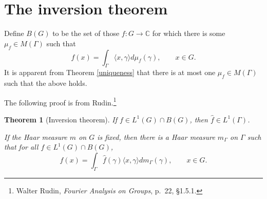 \documentclass{article}
\newcommand{\inner}[2]{\langle #1, #2 \rangle}
\newtheorem{theorem}{Theorem}
\begin{document}
\section{The inversion theorem}
Define $B(G)$ to be the set of those $f:G \to \mathbb{C}$ for which there is some $\mu_f \in M(\Gamma)$ such that
\[
f(x) = \int_\Gamma \inner{x}{\gamma} d\mu_f(\gamma), \qquad x \in G.
\]
It is apparent from Theorem \ref{uniqueness} that there is at most one $\mu_f \in M(\Gamma)$ such that the above holds.

The following proof is from Rudin.\footnote{Walter Rudin, {\em Fourier Analysis on Groups}, p.~22, \S 1.5.1.}

\begin{theorem}[Inversion theorem]
If $f \in L^1(G) \cap B(G)$, then $\hat{f} \in L^1(\Gamma)$.

If the Haar measure $m$ on $G$ is fixed, then there is a Haar measure $m_\Gamma$ on $\Gamma$ such that for all $f \in
L^1(G) \cap B(G)$,
\[
f(x) = \int_\Gamma \hat{f}(\gamma) \inner{x}{\gamma} dm_\Gamma(\gamma), \qquad x \in G.
\]
\end{theorem}
\end{document}
